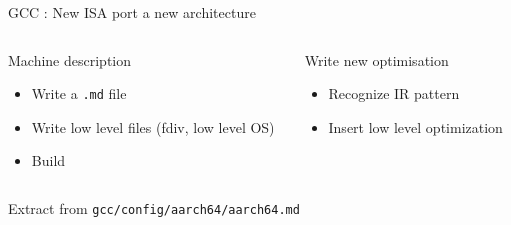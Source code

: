 \begin{Frame}{GCC : New ISA port a new architecture}
 \begin{columns}[t]
  \begin{column}{\BW}
    \begin{block}{Machine description}
      \begin{itemize}
        \item Write a \texttt{.md} file
        \item Write low level files (fdiv, low level OS)
        \item Build
      \end{itemize}
    \end{block}
  \end{column}
  \begin{column}{\BW}
    \begin{block}{Write new optimisation}
      \begin{itemize}
      \item Recognize IR pattern
      \item Insert low level optimization
      \end{itemize}
    \end{block}
  \end{column}
 \end{columns}
 \begin{block}{Extract from \texttt{gcc/config/aarch64/aarch64.md}}
   
 \end{block}
\end{Frame}
